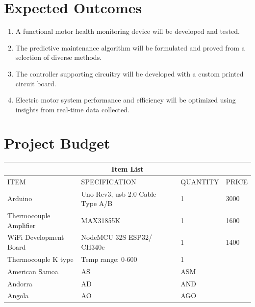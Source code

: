\section{Expected Outcomes}
\begin{enumerate}
\item A functional motor health monitoring device will be developed and tested.
\item The predictive maintenance algorithm will be formulated and proved from a selection
of diverse methods.
\item The controller supporting circuitry will be developed with a custom printed circuit
board.
\item Electric motor system performance and efficiency will be optimized using insights from real-time data collected.
\end{enumerate}
\newpage
\section{Project Budget}
\setlength{\arrayrulewidth}{0.5mm}
\setlength{\tabcolsep}{18pt}
\renewcommand{\arraystretch}{1.5}
	\begin{tabular}{ |p{3cm}|p{3cm}|p{3cm}|p{3cm}|  }
		\hline
		\multicolumn{4}{|c|}{\textbf{Item List}} \\
		\hline
		ITEM & SPECIFICATION & QUANTITY & PRICE \\
		\hline
		Arduino & Uno Rev3, usb 2.0 Cable Type A/B & 1 & 3000 \\
		\hline
		Thermocouple Amplifier & MAX31855K & 1 & 1600 \\
		\hline
		WiFi Development Board & NodeMCU 32S ESP32/ CH340c  & 1 & 1400 \\
		\hline
		Thermocouple K type&Temp range: 0-600  & 1 & \\
		American Samoa & AS & ASM & \\
		Andorra & AD & AND   &\\
		Angola & AO & AGO &\\
		\hline
	\end{tabular}
